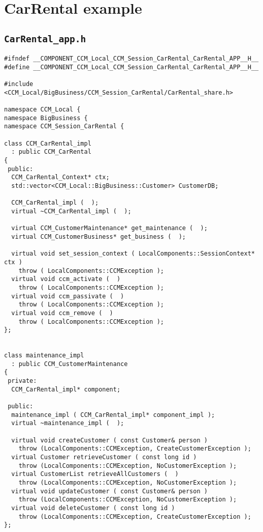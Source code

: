 \chapter{CarRental example}



\section{{\tt CarRental\_app.h}}
\begin{scriptsize}
\begin{verbatim}
#ifndef __COMPONENT_CCM_Local_CCM_Session_CarRental_CarRental_APP__H__
#define __COMPONENT_CCM_Local_CCM_Session_CarRental_CarRental_APP__H__

#include <CCM_Local/BigBusiness/CCM_Session_CarRental/CarRental_share.h>

namespace CCM_Local {
namespace BigBusiness {
namespace CCM_Session_CarRental {

class CCM_CarRental_impl
  : public CCM_CarRental
{
 public:
  CCM_CarRental_Context* ctx;
  std::vector<CCM_Local::BigBusiness::Customer> CustomerDB;

  CCM_CarRental_impl (  );
  virtual ~CCM_CarRental_impl (  );

  virtual CCM_CustomerMaintenance* get_maintenance (  );
  virtual CCM_CustomerBusiness* get_business (  );

  virtual void set_session_context ( LocalComponents::SessionContext* ctx )
    throw ( LocalComponents::CCMException );
  virtual void ccm_activate (  )
    throw ( LocalComponents::CCMException );
  virtual void ccm_passivate (  )
    throw ( LocalComponents::CCMException );
  virtual void ccm_remove (  )
    throw ( LocalComponents::CCMException );
};


class maintenance_impl
  : public CCM_CustomerMaintenance
{
 private:
  CCM_CarRental_impl* component;

 public:
  maintenance_impl ( CCM_CarRental_impl* component_impl );
  virtual ~maintenance_impl (  );

  virtual void createCustomer ( const Customer& person ) 
    throw (LocalComponents::CCMException, CreateCustomerException );
  virtual Customer retrieveCustomer ( const long id ) 
    throw (LocalComponents::CCMException, NoCustomerException );
  virtual CustomerList retrieveAllCustomers (  ) 
    throw (LocalComponents::CCMException, NoCustomerException );
  virtual void updateCustomer ( const Customer& person ) 
    throw (LocalComponents::CCMException, NoCustomerException );
  virtual void deleteCustomer ( const long id ) 
    throw (LocalComponents::CCMException, CreateCustomerException );
};



\end{verbatim}
\end{scriptsize}
